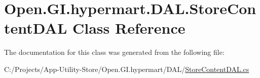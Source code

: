 \hypertarget{class_open_1_1_g_i_1_1hypermart_1_1_d_a_l_1_1_store_content_d_a_l}{}\section{Open.\+G\+I.\+hypermart.\+D\+A\+L.\+Store\+Content\+D\+AL Class Reference}
\label{class_open_1_1_g_i_1_1hypermart_1_1_d_a_l_1_1_store_content_d_a_l}


The documentation for this class was generated from the following file\+:\begin{DoxyCompactItemize}
\item 
C\+:/\+Projects/\+App-\/\+Utility-\/\+Store/\+Open.\+G\+I.\+hypermart/\+D\+A\+L/\hyperlink{_store_content_d_a_l_8cs}{Store\+Content\+D\+A\+L.\+cs}\end{DoxyCompactItemize}
